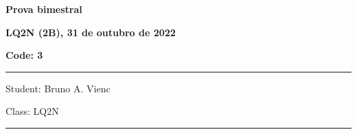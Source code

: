 \documentclass[12pt, addpoints]{exam}
\begin{document}
        \begin{minipage}[b]{0.75\linewidth}
            \begin{flushleft}
                {\bf \large Prova bimestral}
            \end{flushleft}
            \begin{flushleft}
                {\bf \large LQ2N (2B), 31 de outubro de 2022}
            \end{flushleft}
        \end{minipage}
        \begin{minipage}[b]{0.20\linewidth}
            \begin{flushright}
                {\bf \large Code: 3}
            \end{flushright}
        \end{minipage}
        \vspace{0.5cm} \hrule \vspace{0.5cm}
        \begin{minipage}{0.75\linewidth}
            \begin{flushleft}
                Student: Bruno A. Vienc
            \end{flushleft}
        \end{minipage}
        \begin{minipage}{0.20\linewidth}
            \begin{flushright}
                Class: LQ2N
            \end{flushright}
        \end{minipage}
        \vspace{0.5cm} \hrule \vspace{0.5cm}
\end{document}
